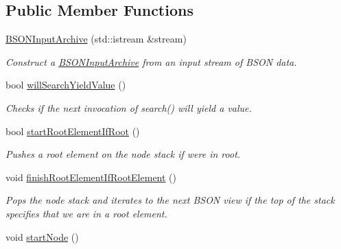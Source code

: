 \subsection*{Public Member Functions}
\begin{DoxyCompactItemize}
\item 
\hyperlink{classbson__mapper_1_1BSONInputArchive_a6b8ddbbd18800ef0f8e250c31da095e8}{B\+S\+O\+N\+Input\+Archive} (std\+::istream \&stream)
\begin{DoxyCompactList}\small\item\em Construct a \hyperlink{classbson__mapper_1_1BSONInputArchive}{B\+S\+O\+N\+Input\+Archive} from an input stream of B\+S\+ON data. \end{DoxyCompactList}\item 
bool \hyperlink{classbson__mapper_1_1BSONInputArchive_a0b8d043db14caa7d4e35d8e5300cd69f}{will\+Search\+Yield\+Value} ()
\begin{DoxyCompactList}\small\item\em Checks if the next invocation of search() will yield a value. \end{DoxyCompactList}\item 
bool \hyperlink{classbson__mapper_1_1BSONInputArchive_ab0b224d34f6dd2fd9ee542571536638b}{start\+Root\+Element\+If\+Root} ()
\begin{DoxyCompactList}\small\item\em Pushes a root element on the node stack if we\textquotesingle{}re in root. \end{DoxyCompactList}\item 
void \hyperlink{classbson__mapper_1_1BSONInputArchive_a1100f99901973ebefab2198d2381e953}{finish\+Root\+Element\+If\+Root\+Element} ()\hypertarget{classbson__mapper_1_1BSONInputArchive_a1100f99901973ebefab2198d2381e953}{}\label{classbson__mapper_1_1BSONInputArchive_a1100f99901973ebefab2198d2381e953}

\begin{DoxyCompactList}\small\item\em Pops the node stack and iterates to the next B\+S\+ON view if the top of the stack specifies that we are in a root element. \end{DoxyCompactList}\item 
void \hyperlink{classbson__mapper_1_1BSONInputArchive_a6f74b53f0989e9222be00dec0e6d350f}{start\+Node} ()\hypertarget{classbson__mapper_1_1BSONInputArchive_a6f74b53f0989e9222be00dec0e6d350f}{}\label{classbson__mapper_1_1BSONInputArchive_a6f74b53f0989e9222be00dec0e6d350f}


\end{DoxyCompactItemize}
